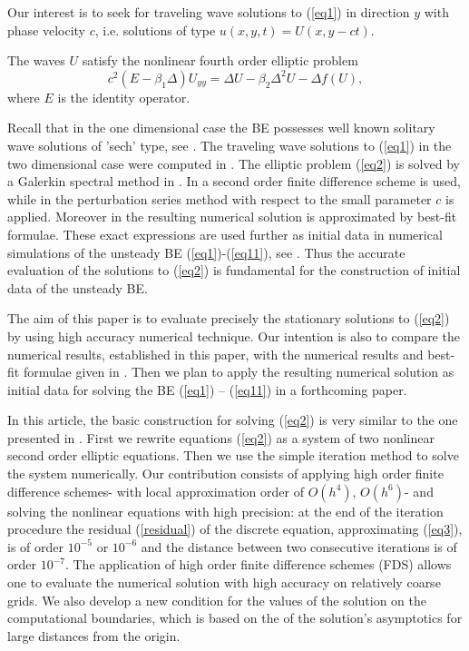 \documentclass[preprint]{elsarticle}
\newcommand{\rf}[1]{(\ref{#1})}
\begin{document}
Our interest is to seek for traveling wave solutions to \rf{eq1} in direction $y$  with phase velocity $c$,  i.e. solutions of type  $u(x,y,t)=U(x,y-ct)$. 

The waves $U$ satisfy the nonlinear fourth order  elliptic problem
\begin{equation}\label{eq2}
c^2 (E-\beta_1 \Delta) U_{yy} = \Delta U -\beta_2 \Delta^2 U - \Delta f(U),
\end{equation}
where $E$ is the identity operator. 



Recall that in the one dimensional case the BE possesses well known solitary wave solutions of 'sech' type, see \cite{Ch1996}. 
The  traveling wave solutions to \rf{eq1} in the two dimensional case  were  computed in \cite{chd-chr, chr-chr-07,chr-chr,Ch2011,Ch2012}. 
The elliptic problem \rf{eq2} is solved by a Galerkin spectral method in \cite{chr-chr-07,chr-chr}.
In \cite{Ch2012} a second order  finite difference scheme is used, while in \cite{Ch2011} 
 the perturbation series method with respect to the small parameter $c$ is applied.  Moreover in  \cite{Ch2011} 
the resulting numerical  solution is approximated by best-fit  formulae.  These exact expressions  are used further as initial data in numerical simulations of the unsteady  BE \rf{eq1}-\rf{eq11}, see  \cite{cher,dani}.
Thus the accurate evaluation of the solutions to \rf{eq2} is fundamental for the construction of initial data of the unsteady BE. 


The aim of this paper is to evaluate  precisely  the stationary solutions to \rf{eq2} by  using high accuracy numerical technique. Our intention is also  to compare  the numerical results, established in this paper, with the numerical results and best-fit formulae given in \cite{Ch2011,Ch2012}.  
Then we plan to apply the resulting numerical solution as initial data for solving  the  BE \rf{eq1} -- \rf{eq11}
in a forthcoming paper.

In this article, the basic construction  for solving \rf{eq2}  is
very similar to the one presented in \cite{Ch2012}. 
First we rewrite equations \rf{eq2} as a system of two nonlinear second order elliptic equations. Then we use the simple iteration method to solve the system numerically. Our contribution consists of 
 applying  high order finite difference schemes- with  local approximation order of $O(h^4)$, $O(h^6)$-  and  solving   the nonlinear equations  with  high precision: at the end of the iteration procedure the residual \rf{residual} of the discrete equation, approximating \rf{eq3}, is of order $10^{-5}$ or $10^{-6}$ and the distance between two consecutive iterations is of order $10^{-7}$. The application of high order finite difference schemes (FDS) allows one to evaluate the numerical solution  with high accuracy on relatively coarse grids. 
 We also develop a new condition for the values of the solution on the computational boundaries, which is based on the  of the solution's asymptotics  for large distances from the origin. 
\end{document}
